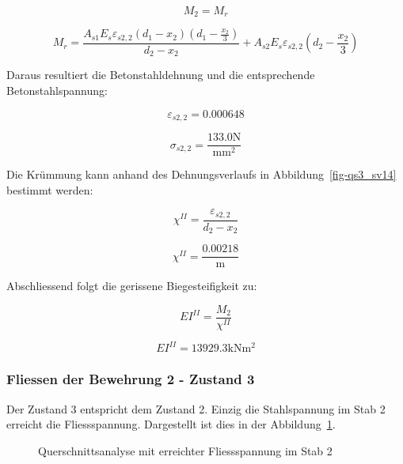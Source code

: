 \documentclass[
  12pt,
  letterpaper,
  egregdoesnotlikesansseriftitles]{scrreprt}
\begin{document}
\begin{equation}M_{2} = M_{r}\end{equation}

\begin{equation}M_{r} = \frac{A_{s 1} E_{s} \varepsilon_{s2,2} \left(d_{1} - x_{2}\right) \left(d_{1} - \frac{x_{2}}{3}\right)}{d_{2} - x_{2}} + A_{s 2} E_{s} \varepsilon_{s2,2} \left(d_{2} - \frac{x_{2}}{3}\right)\end{equation}

Daraus resultiert die Betonstahldehnung und die entsprechende
Betonstahlspannung:

\begin{equation}\varepsilon_{s2,2} = 0.000648\end{equation}

\begin{equation}\sigma_{s 2,2} = \frac{133.0 \text{N}}{\text{mm}^{2}}\end{equation}

Die Krümmung kann anhand des Dehnungsverlaufs in
Abbildung~\ref{fig-qs3_sv14} bestimmt werden:

\begin{equation}\chi^{II} = \frac{\varepsilon_{s2,2}}{d_{2} - x_{2}}\end{equation}

\begin{equation}\chi^{II} = \frac{0.00218}{\text{m}}\end{equation}

Abschliessend folgt die gerissene Biegesteifigkeit zu:

\begin{equation}EI^{II} = \frac{M_{2}}{\chi^{II}}\end{equation}

\begin{equation}EI^{II} = 13929.3 \text{kN} \text{m}^{2}\end{equation}

\subsubsection{Fliessen der Bewehrung 2 - Zustand
3}\label{fliessen-der-bewehrung-2---zustand-3}

Der Zustand 3 entspricht dem Zustand 2. Einzig die Stahlspannung im Stab
2 erreicht die Fliessspannung. Dargestellt ist dies in der
Abbildung~\ref{fig-qs4_sv14}.

\begin{figure}[H]


\caption{\label{fig-qs4_sv14}Querschnittsanalyse mit erreichter
Fliessspannung im Stab 2}

\end{figure}%
\end{document}
